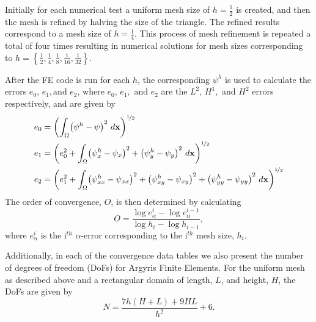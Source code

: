 Initially for each numerical test a uniform mesh size of $h=\frac{1}{2}$ is created, and then the mesh
is refined by halving the size of the triangle. The refined results correspond to a mesh size of $h=\frac{1}{4}$.  This
process of mesh refinement is repeated a total of four times resulting in numerical solutions for mesh sizes
corresponding to $h=\left\{\frac{1}{2},\frac{1}{4},\frac{1}{8},\frac{1}{16},\frac{1}{32}\right\}$.
%

After the FE code is run for each $h$, the corresponding $\psi^h$ is used to calculate the errors $e_0,\, e_1,\text{
and } e_2$, where $e_0,\, e_1,\text{ and } e_2$ are the $L^2,\, H^1,$ and $H^2$ errors respectively, and are
given by
\begin{align*}
  e_0 &= \left(\int_{\Omega}\!\left( \psi^h - \psi \right)^2 \,d\mathbf{x}\right)^{\nicefrac{1}{2}}\\
  e_1 &= \left(e_0^2 + \int_{\Omega}\!  \left( \psi^h_x - \psi_x \right)^2 + \left( \psi^h_y - \psi_y \right)^2
    \,d\mathbf{x}\right)^{\nicefrac{1}{2}}\\
  e_2 &= \left(e_1^2 + \int_{\Omega}\!  \left( \psi^h_{xx} - \psi_{xx} \right)^2 + \left( \psi^h_{xy} - \psi_{xy}
    \right)^2 + \left( \psi^h_{yy} - \psi_{yy} \right)^2 \,d\mathbf{x}\right)^{\nicefrac{1}{2}}\\
\end{align*}
The order of convergence, $O$, is then determined by calculating
\begin{equation*}
  O = \dfrac{\log e_{\alpha}^i - \log e_{\alpha}^{i-1}}{\log h_i - \log h_{i-1}},
\end{equation*}
where $e_{\alpha}^i$ is the i$^{th}$ $\alpha$-error corresponding to the i$^{th}$ mesh size, $h_i$.

Additionally, in each of the convergence data tables we also present the number of degrees of freedom (DoFs) for Argyris
Finite Elements. For the uniform mesh as described above and a rectangular domain of length, $L$, and height, $H$, the
DoFs are given by
\begin{equation*}
  N = \frac{7h\left(H + L\right) + 9 H L}{h^2} + 6.
\end{equation*}
